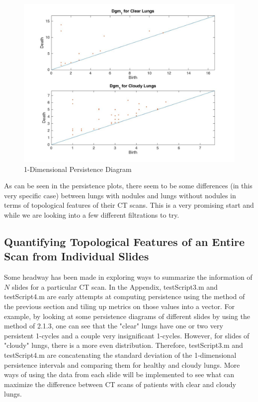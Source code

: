 \documentclass[12pt]{report}
\begin{document}
\begin{figure}[H]
\centering
	\includegraphics[width=0.8\linewidth]{tSdgm1.jpg}
	\caption{1-Dimensional Persistence Diagram}
\end{figure}\newline

As can be seen in the persistence plots, there seem to be some differences (in this very specific case) between lungs with nodules and lungs without nodules in terms of topological features of their CT scans. This is a very promising start and while we are looking into a few different filtrations to try.\newline
\\
\subsection{Quantifying Topological Features of an Entire Scan from Individual Slides}

Some headway has been made in exploring ways to summarize the information of $N$ slides for a particular CT scan. In the Appendix, testScript3.m and testScript4.m are early attempts at computing persistence using the method of the previous section and tiling up metrics on those values into a vector. For example, by looking at some persistence diagrams of different slides by using the method of 2.1.3, one can see that the "clear" lungs have one or two very persistent 1-cycles and a couple very insignificant 1-cycles. However, for slides of "cloudy" lungs, there is a more even distribution. Therefore, testScript3.m and testScript4.m are concatenating the standard deviation of the 1-dimensional persistence intervals and comparing them for healthy and cloudy lungs. More ways of using the data from each slide will be implemented to see what can maximize the difference between CT scans of patients with clear and cloudy lungs.
\end{document}
